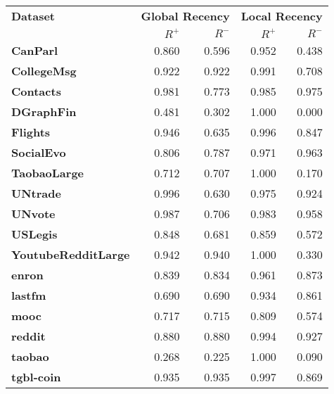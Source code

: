\begin{tabular}{lrrrr}
\toprule
\textbf{Dataset} & \multicolumn{2}{c}{\textbf{Global Recency}} & \multicolumn{2}{c}{\textbf{Local Recency}} \\
                 & $R^+$            & $R^-$            & $R^+$            & $R^-$            \\
\midrule
\textbf{CanParl}            & 0.860          & 0.596          & 0.952          & 0.438          \\
\textbf{CollegeMsg}         & 0.922          & 0.922          & 0.991          & 0.708          \\
\textbf{Contacts}           & 0.981          & 0.773          & 0.985          & 0.975          \\
\textbf{DGraphFin}          & 0.481          & 0.302          & 1.000          & 0.000          \\
\textbf{Flights}            & 0.946          & 0.635          & 0.996          & 0.847          \\
\textbf{SocialEvo}          & 0.806          & 0.787          & 0.971          & 0.963          \\
\textbf{TaobaoLarge}        & 0.712          & 0.707          & 1.000          & 0.170          \\
\textbf{UNtrade}            & 0.996          & 0.630          & 0.975          & 0.924          \\
\textbf{UNvote}             & 0.987          & 0.706          & 0.983          & 0.958          \\
\textbf{USLegis}            & 0.848          & 0.681          & 0.859          & 0.572          \\
\textbf{YoutubeRedditLarge} & 0.942          & 0.940          & 1.000          & 0.330          \\
\textbf{enron}              & 0.839          & 0.834          & 0.961          & 0.873          \\
\textbf{lastfm}             & 0.690          & 0.690          & 0.934          & 0.861          \\
\textbf{mooc}               & 0.717          & 0.715          & 0.809          & 0.574          \\
\textbf{reddit}             & 0.880          & 0.880          & 0.994          & 0.927          \\
\textbf{taobao}             & 0.268          & 0.225          & 1.000          & 0.090          \\
\textbf{tgbl-coin}          & 0.935          & 0.935          & 0.997          & 0.869          \\

\end{tabular}
